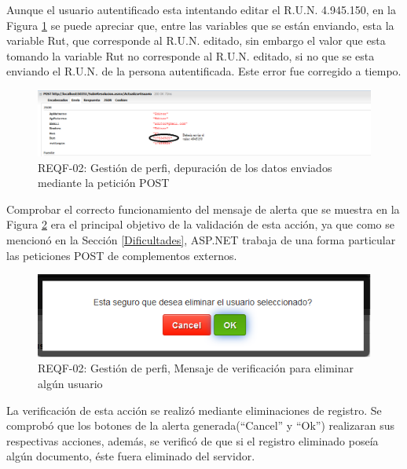 Aunque el usuario autentificado esta intentando editar el  R.U.N. 4.945.150, en la Figura \ref{REQF-02-post}  se puede apreciar que, entre las variables que se están enviando, esta la variable Rut, que corresponde al R.U.N. editado, sin embargo el valor que esta tomando la variable  Rut no corresponde al R.U.N. editado, si no  que se esta enviando el R.U.N. de la persona autentificada. Este error fue corregido a tiempo.
\begin{figure}[H]
	\centering
	\includegraphics[width=1\textwidth]{images/Capitulo_5/REQF-02-post.png}
	\caption[REQF-02: Gestión de perfil, depuración de los datos enviados mediante la petición POST]{REQF-02: Gestión de perfi, depuración de los datos enviados mediante la petición POST}
	\label{REQF-02-post}
\end{figure}


Comprobar el correcto funcionamiento del mensaje de alerta que se muestra en la Figura \ref{REQF-02-eliminar} era el principal objetivo de la validación de esta acción, ya que como se mencionó en la Sección \ref{Dificultades}, ASP.NET trabaja de una forma particular las peticiones POST de complementos externos.
\begin{figure}[H]
	\centering
	\includegraphics[width=1\textwidth]{images/Capitulo_5/REQF-02-Eliminar.png}
	\caption[REQF-02: Gestión de perfil, Mensaje de verificación para eliminar algún usuario]{REQF-02: Gestión de perfi, Mensaje de verificación para eliminar algún usuario}
	\label{REQF-02-eliminar}
\end{figure}

La verificación de esta acción se realizó mediante eliminaciones de registro. Se comprobó que los botones de la alerta generada(``Cancel'' y ``Ok'') realizaran sus respectivas acciones, además, se verificó de que si el registro eliminado poseía algún documento, éste fuera eliminado del servidor.


